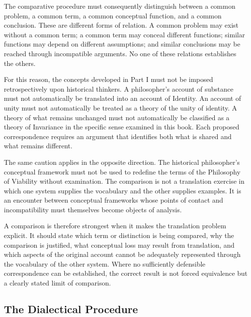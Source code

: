 \label{para:VS.B01.P01.C08.S01.SS03.P002}
The comparative procedure must consequently distinguish
between a common problem, a common term, a common conceptual
function, and a common conclusion. These are different forms
of relation. A common problem may exist without a common
term; a common term may conceal different functions; similar
functions may depend on different assumptions; and similar
conclusions may be reached through incompatible arguments.
No one of these relations establishes the others.

\label{para:VS.B01.P01.C08.S01.SS03.P003}
For this reason, the concepts developed in Part I must not be
imposed retrospectively upon historical thinkers. A
philosopher's account of substance must not automatically be
translated into an account of Identity. An account of unity
must not automatically be treated as a theory of the unity of
identity. A theory of what remains unchanged must not
automatically be classified as a theory of Invariance in the
specific sense examined in this book. Each proposed
correspondence requires an argument that identifies both
what is shared and what remains different.

\label{para:VS.B01.P01.C08.S01.SS03.P004}
The same caution applies in the opposite direction. The
historical philosopher's conceptual framework must not be
used to redefine the terms of the Philosophy of Viability
without examination. The comparison is not a translation
exercise in which one system supplies the vocabulary and the
other supplies examples. It is an encounter between
conceptual frameworks whose points of contact and
incompatibility must themselves become objects of analysis.

\label{para:VS.B01.P01.C08.S01.SS03.P005}
A comparison is therefore strongest when it makes the
translation problem explicit. It should state which term or
distinction is being compared, why the comparison is
justified, what conceptual loss may result from translation,
and which aspects of the original account cannot be
adequately represented through the vocabulary of the other
system. Where no sufficiently defensible correspondence can
be established, the correct result is not forced equivalence
but a clearly stated limit of comparison.

\subsection{The Dialectical Procedure}
\label{sec:ch08-s01-ss04}

